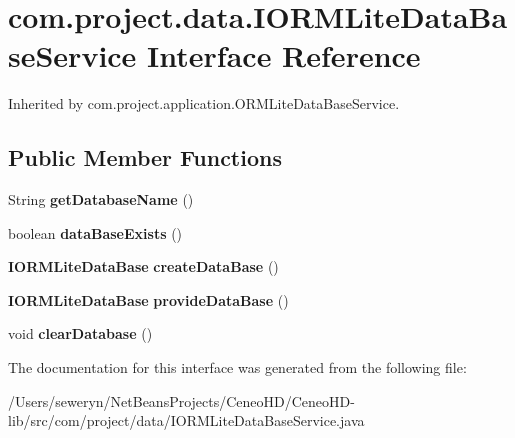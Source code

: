\section{com.\+project.\+data.\+I\+O\+R\+M\+Lite\+Data\+Base\+Service Interface Reference}
\label{interfacecom_1_1project_1_1data_1_1_i_o_r_m_lite_data_base_service}


Inherited by com.\+project.\+application.\+O\+R\+M\+Lite\+Data\+Base\+Service.

\subsection*{Public Member Functions}
\begin{DoxyCompactItemize}
\item 
\mbox{\label{interfacecom_1_1project_1_1data_1_1_i_o_r_m_lite_data_base_service_ae8b4a80a6c39c0021c9b0ab67a62a029}} 
String {\bfseries get\+Database\+Name} ()
\item 
\mbox{\label{interfacecom_1_1project_1_1data_1_1_i_o_r_m_lite_data_base_service_a38a2ce5473d89f3cf84b73a8829f4575}} 
boolean {\bfseries data\+Base\+Exists} ()
\item 
\mbox{\label{interfacecom_1_1project_1_1data_1_1_i_o_r_m_lite_data_base_service_a24bf24ed4c79e77d1252c0baba26aec5}} 
\textbf{ I\+O\+R\+M\+Lite\+Data\+Base} {\bfseries create\+Data\+Base} ()
\item 
\mbox{\label{interfacecom_1_1project_1_1data_1_1_i_o_r_m_lite_data_base_service_a8c9c24432ba2c1785c0e1aa6dac06a7f}} 
\textbf{ I\+O\+R\+M\+Lite\+Data\+Base} {\bfseries provide\+Data\+Base} ()
\item 
\mbox{\label{interfacecom_1_1project_1_1data_1_1_i_o_r_m_lite_data_base_service_a9780030e889277fedf7b5d124ac326a6}} 
void {\bfseries clear\+Database} ()
\end{DoxyCompactItemize}


The documentation for this interface was generated from the following file\+:\begin{DoxyCompactItemize}
\item 
/\+Users/seweryn/\+Net\+Beans\+Projects/\+Ceneo\+H\+D/\+Ceneo\+H\+D-\/lib/src/com/project/data/I\+O\+R\+M\+Lite\+Data\+Base\+Service.\+java\end{DoxyCompactItemize}
